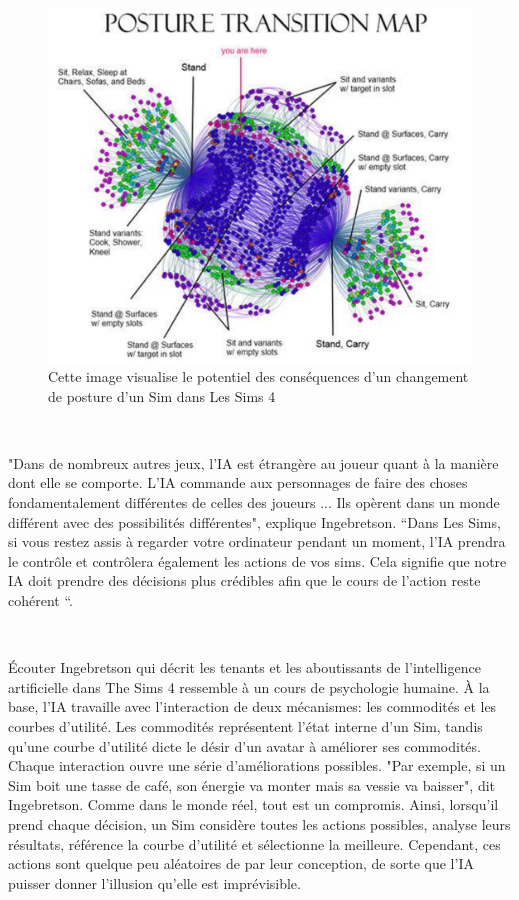 \begin{figure}[th]
\centering
\includegraphics{Figures/sims.JPG}
\decoRule
\caption[Le potentiel des conséquences d'un changement de posture d'un Sim dans Les Sims 4]{Cette image visualise le potentiel des conséquences d'un changement de posture d'un Sim dans Les Sims 4}
\label{fig:sims}
\end{figure}


~\par
"Dans de nombreux autres jeux, l'IA est étrangère au joueur quant à la manière dont elle se comporte. L'IA commande aux personnages de faire des choses fondamentalement différentes de celles des joueurs ... Ils opèrent dans un monde différent avec des possibilités différentes", explique Ingebretson. “Dans Les Sims, si vous restez assis à regarder votre ordinateur pendant un moment, l'IA prendra le contrôle et contrôlera également les actions de vos sims. Cela signifie que notre IA  doit prendre des décisions plus crédibles afin que le cours de l’action reste cohérent “\parencite{simsArticle}.

~\par
Écouter Ingebretson qui décrit les tenants et les aboutissants de l’intelligence artificielle dans The Sims 4 ressemble à un cours de psychologie humaine. À la base, l'IA travaille avec l'interaction de deux mécanismes: les commodités et les courbes d'utilité. Les commodités représentent l'état interne d'un Sim, tandis qu'une courbe d'utilité dicte le désir d’un avatar à améliorer ses commodités. Chaque interaction ouvre une série d'améliorations possibles. "Par exemple, si un Sim boit une tasse de café, son énergie va monter mais sa vessie va baisser", dit Ingebretson. Comme dans le monde réel, tout est un compromis. Ainsi, lorsqu'il prend chaque décision, un Sim considère toutes les actions possibles, analyse leurs résultats, référence la courbe d'utilité et sélectionne la meilleure. Cependant, ces actions sont quelque peu aléatoires de par leur conception, de sorte que l'IA puisser donner l’illusion qu’elle est imprévisible.

